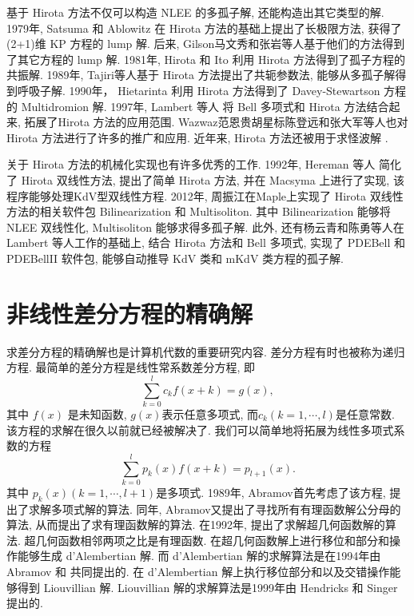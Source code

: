 基于 Hirota 方法不仅可以构造 NLEE 的多孤子解, 还能构造出其它类型的解. 
1979年, Satsuma 和 Ablowitz\cite{satsuma1979two} 在 Hirota 方法的基础上提出了长极限方法, 获得了(2+1)维 KP 方程\cite{kadomtsev1970stability}的 lump 解. 后来, Gilson\cite{gilson1990lump}\D 马文秀\cite{ma2015lump}和张岩\cite{zhangYTSF,zhang2018m}等人基于他们的方法得到了其它方程的 lump 解.
1981年, Hirota 和 Ito \cite{hirota1983resonance}利用 Hirota 方法得到了孤子方程的共振解. 
1989年, Tajiri等人\cite{tajiri1989breather}基于 Hirota 方法提出了共轭参数法, 能够从多孤子解得到呼吸子解. 
1990年， Hietarinta \cite{hietarinta1990multidromion} 利用 Hirota 方法得到了 Davey-Stewartson 方程的 Multidromion 解. 
1997年, Lambert 等人\cite{gilson1996combinatorics,lambert1997construction} 将 Bell 多项式和 Hirota 方法结合起来, 拓展了Hirota 方法的应用范围. 
Wazwaz\cite{wazwaz2008multiple}\D 范恩贵\cite{fan2011new}\D 胡星标\cite{hu2002application}\D 陈登远\cite{chen2002novel}和张大军\cite{zhang2003n}等人也对 Hirota 方法进行了许多的推广和应用. 近年来, Hirota 方法还被用于求怪波解 \cite{guo2011rogue,sun2018general,zhaqilao2018symbolic}.

关于 Hirota 方法的机械化实现也有许多优秀的工作. 1992年, Hereman 等人\cite{hereman1992symbolic,hereman1991macsyma} 简化了 Hirota 双线性方法, 提出了简单 Hirota 方法, 并在 Macsyma 上进行了实现, 该程序能够处理KdV型双线性方程. 2012年, 周振江\cite{zhou2012}在Maple上实现了 Hirota 双线性方法的相关软件包 Bilinearization 和 Multisoliton. 其中 Bilinearization 能够将 NLEE 双线性化, Multisoliton 能够求得多孤子解. 此外, 还有杨云青和陈勇等人\cite{yang2011,miao2014pdebellii}在 Lambert 等人工作的基础上, 结合 Hirota 方法和 Bell 多项式, 实现了 PDEBell 和 PDEBellII 软件包, 能够自动推导 KdV 类和 mKdV 类方程的孤子解. 

\section{非线性差分方程的精确解}
求差分方程的精确解也是计算机代数的重要研究内容. 差分方程有时也被称为递归方程. 最简单的差分方程是线性常系数差分方程, 即
\begin{equation}
\sum_{k=0}^l{c_k f(x+k)}=g(x),
\label{ceq}
\end{equation}
其中 $f(x)$ 是未知函数, $g(x)$表示任意多项式, 而$c_k (k=1,\cdots,l)$是任意常数. 该方程的求解在很久以前就已经被解决了. 我们可以简单地将拓展为线性多项式系数的方程
\begin{equation}
\sum_{k=0}^l{p_k(x)f(x+k)=p_{l+1}(x)}.
\label{peq}
\end{equation}
其中 $p_k(x) (k=1,\cdots,l+1)$是多项式. 1989年, Abramov\cite{Abramov1989polynomial}首先考虑了该方程, 提出了求解多项式解的算法. 同年, Abramov\cite{Abramov1989rational}又提出了寻找所有有理函数解公分母的算法, 从而提出了求有理函数解的算法. 在1992年, \Petkovsek{}\cite{petkovvsek1992hypergeometric}提出了求解超几何函数解的算法. 超几何函数相邻两项之比是有理函数. 在超几何函数解上进行移位和部分和操作能够生成 d'Alembertian 解. 而 d'Alembertian 解的求解算法是在1994年由 Abramov 和 \Petkovsek{} \cite{abramov1994dAlembertian}共同提出的. 在 d'Alembertian 解上执行移位\D 部分和以及交错操作能够得到 Liouvillian 解. Liouvillian 解的求解算法是1999年由 Hendricks 和 Singer \cite{hendricks1999Liouvillian}提出的.

